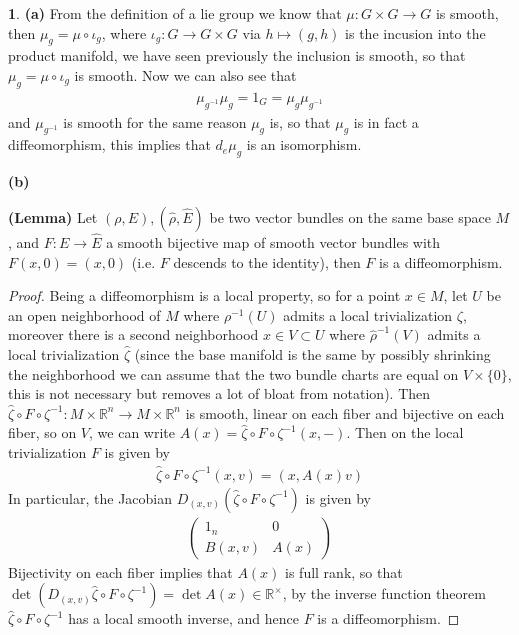\documentclass[10.5pt]{article}
\theoremstyle{definition}
\newtheorem{pb}{}
\newcommand{\set}[1]{\{#1\}}
\begin{document}
    \begin{pb}
        \textbf{(a)} From the definition of a lie group we know that \(\mu: G\times G \to G\) is smooth, then \(\mu_g = \mu \circ \iota_g\), where \(\iota_g: G \to G \times G\) via \(h \mapsto (g,h)\) is the incusion into the product manifold, we have seen previously the inclusion is smooth, so that \(\mu_g = \mu \circ\iota_g\) is smooth. Now we can also see that
        \begin{align*}
            \mu_{g^{-1}}\mu_g = 1_G = \mu_g\mu_{g^{-1}}
        \end{align*}
        and \(\mu_{g^{-1}}\) is smooth for the same reason \(\mu_g\) is, so that \(\mu_g\) is in fact a diffeomorphism, this implies that \(d_e\mu_g\) is an isomorphism.

        \textbf{(b)} 
        
        \textbf{(Lemma)} Let \((\rho,E), (\widehat{\rho},\widehat{E})\) be two vector bundles on the same base space \(M\), and \(F: E \to \widehat{E}\) a smooth bijective map of smooth vector bundles with \(F(x,0) = (x,0)\) (i.e. \(F\) descends to the identity), then \(F\) is a diffeomorphism.
        \begin{proof}
            Being a diffeomorphism is a local property, so for a point \(x \in M\), let \(U\) be an open neighborhood of \(M\) where \(\rho^{-1}(U)\) admits a local trivialization \(\zeta\), moreover there is a second neighborhood \(x \in V \subset U\) where \(\widehat{\rho}^{-1}(V)\) admits a local trivialization \(\widehat{\zeta}\) (since the base manifold is the same by possibly shrinking the neighborhood we can assume that the two bundle charts are equal on \(V\times \set{0}\), this is not necessary but removes a lot of bloat from notation). Then \(\widehat{\zeta}\circ F\circ\zeta^{-1}: M \times \mathbb{R}^n \to M \times \mathbb{R}^n\) is smooth, linear on each fiber and bijective on each fiber, so on \(V\), we can write \(A(x) = \widehat{\zeta}\circ F\circ\zeta^{-1}(x,-)\). Then on the local trivialization \(F\) is given by
            \begin{align*}
                \widehat{\zeta}\circ F\circ\zeta^{-1}(x,v) = (x,A(x)v)
            \end{align*}
            In particular, the Jacobian \(D_{(x,v)} (\widehat{\zeta}\circ F\circ\zeta^{-1})\) is given by
            \begin{align*}
                \begin{pmatrix} 1_n & 0 \\ B(x,v) & A(x) \end{pmatrix}
            \end{align*}
            Bijectivity on each fiber implies that \(A(x)\) is full rank, so that \(\det (D_{(x,v)} \widehat{\zeta}\circ F\circ\zeta^{-1}) = \det A(x) \in \mathbb{R}^\times\), by the inverse function theorem \(\widehat{\zeta}\circ F\circ\zeta^{-1}\) has a local smooth inverse, and hence \(F\) is a diffeomorphism.
        \end{proof}
        

\end{pb}
\end{document}
